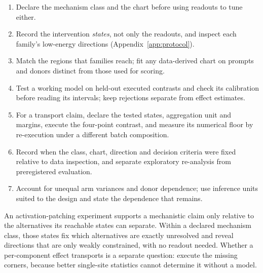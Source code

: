 \documentclass{article}
\theoremstyle{plain}
\theoremstyle{definition}
\begin{document}
\begin{tcolorbox}[title={An audit checklist for patching evidence}]
\begin{enumerate}[leftmargin=1.4em,itemsep=1pt,topsep=1pt,parsep=0pt]
\item Declare the mechanism class and the chart before using readouts to tune either.
\item Record the intervention \emph{states}, not only the readouts, and inspect each family's low-energy directions (Appendix~\ref{app:protocol}).
\item Match the regions that families reach; fit any data-derived chart on prompts and donors distinct from those used for scoring.
\item Test a working model on held-out executed contrasts and check its calibration before reading its intervals; keep rejections separate from effect estimates.
\item For a transport claim, declare the tested states, aggregation unit and margins, execute the four-point contrast, and measure its numerical floor by re-execution under a different batch composition.
\item Record when the class, chart, direction and decision criteria were fixed relative to data inspection, and separate exploratory re-analysis from preregistered evaluation.
\item Account for unequal arm variances and donor dependence; use inference units suited to the design and state the dependence that remains.
\end{enumerate}
\end{tcolorbox}

An activation-patching experiment supports a mechanistic claim only relative to the alternatives its reachable states can separate. Within a declared mechanism class, those states fix which alternatives are exactly unresolved and reveal directions that are only weakly constrained, with no readout needed. Whether a per-component effect transports is a separate question: execute the missing corners, because better single-site statistics cannot determine it without a model.

\clearpage



\appendix


\end{document}
